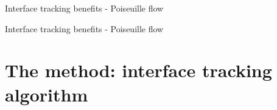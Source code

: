 \documentclass{beamer}  %
\begin{document}
\begin{frame}{Interface tracking benefits - Poiseuille flow}
    \begin{figure}
        \centering
        
    \end{figure}
\end{frame}

\begin{frame}{Interface tracking benefits - Poiseuille flow}
    \begin{figure}
        \centering
        
        \pause
        \hspace{12pt}
        
    \end{figure}
\end{frame}


\section{The method: interface tracking algorithm}



\end{document}
